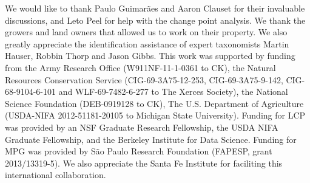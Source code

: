 \documentclass[12pt]{article}
\begin{document}
We would like to thank Paulo Guimar{\~a}es and Aaron Clauset for their
invaluable discussions, and Leto Peel for help with the change point
analysis.  We thank the growers and land owners that allowed us to
work on their property. We also greatly appreciate the identification
assistance of expert taxonomists Martin Hauser, Robbin Thorp and Jason
Gibbs.  This work was supported by funding from the Army Research
Office (W911NF-11-1-0361 to CK), the Natural Resources Conservation
Service (CIG-69-3A75-12-253, CIG-69-3A75-9-142, CIG-68-9104-6-101 and
WLF-69-7482-6-277 to The Xerces Society), the National Science
Foundation (DEB-0919128 to CK), The U.S.  Department of Agriculture
(USDA-NIFA 2012-51181-20105 to Michigan State University).  Funding
for LCP was provided by an NSF Graduate Research Fellowship, the USDA
NIFA Graduate Fellowship, and the Berkeley Institute for Data
Science. Funding for MPG was provided by S{\~a}o Paulo Research
Foundation (FAPESP, grant 2013/13319-5). We also appreciate the Santa
Fe Institute for faciliting this international collaboration.




\end{document}
